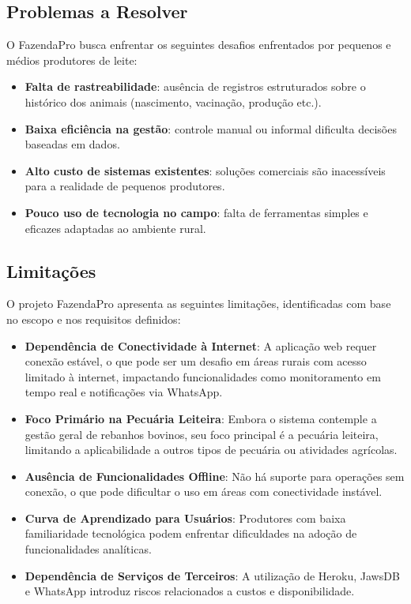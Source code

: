 \documentclass[12pt, a4paper]{article}
\begin{document}
\subsection{Problemas a Resolver}

\begin{spacing}{1.5}
O FazendaPro busca enfrentar os seguintes desafios enfrentados por pequenos e médios produtores de leite:

\begin{itemize}
\item \textbf{Falta de rastreabilidade}: ausência de registros estruturados sobre o histórico dos animais (nascimento, vacinação, produção etc.).
\item \textbf{Baixa eficiência na gestão}: controle manual ou informal dificulta decisões baseadas em dados.
\item \textbf{Alto custo de sistemas existentes}: soluções comerciais são inacessíveis para a realidade de pequenos produtores.
\item \textbf{Pouco uso de tecnologia no campo}: falta de ferramentas simples e eficazes adaptadas ao ambiente rural.
\end{itemize}
\end{spacing}

\subsection{Limitações}
\begin{spacing}{1.5}
O projeto FazendaPro apresenta as seguintes limitações, identificadas com base no escopo e nos requisitos definidos:

\begin{itemize}
    \item \textbf{Dependência de Conectividade à Internet}: A aplicação web requer conexão estável, o que pode ser um desafio em áreas rurais com acesso limitado à internet, impactando funcionalidades como monitoramento em tempo real e notificações via WhatsApp.
    \item \textbf{Foco Primário na Pecuária Leiteira}: Embora o sistema contemple a gestão geral de rebanhos bovinos, seu foco principal é a pecuária leiteira, limitando a aplicabilidade a outros tipos de pecuária ou atividades agrícolas.
    \item \textbf{Ausência de Funcionalidades Offline}: Não há suporte para operações sem conexão, o que pode dificultar o uso em áreas com conectividade instável.
    \item \textbf{Curva de Aprendizado para Usuários}: Produtores com baixa familiaridade tecnológica podem enfrentar dificuldades na adoção de funcionalidades analíticas.
    \item \textbf{Dependência de Serviços de Terceiros}: A utilização de Heroku, JawsDB e WhatsApp introduz riscos relacionados a custos e disponibilidade.
\end{itemize}
\end{spacing}
\end{document}
